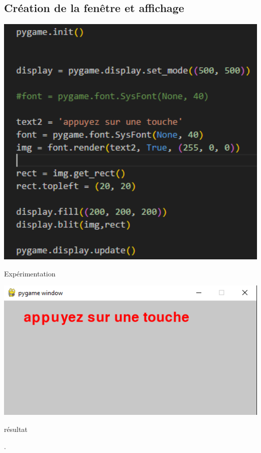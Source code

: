 \documentclass[12pt]{article}\usepackage{indentfirst}\usepackage[margin=2cm]{geometry}
\begin{document}
	\subsection{Création de la fenêtre et affichage}
    \begin{minipage}{0.49\textwidth}
    \centering
    \includegraphics[width=1\textwidth]{Images/2.png}
    \caption{Expérimentation}
    \label{fig:1}
    \end{minipage}
    \hfill
    \begin{minipage}{0.49\textwidth}
    \centering
    \includegraphics[width=1\textwidth]{Images/3.png}
    \caption{résultat}
    \label{fig:2}
    \end{minipage}.
\end{document}
